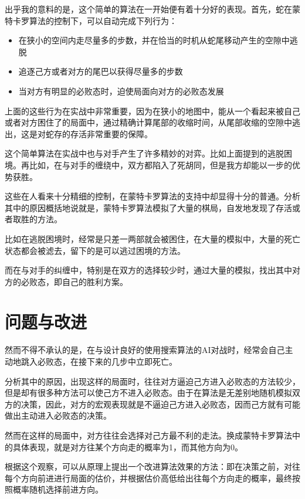 \documentclass[UTF8]{ctexart}
\begin{document}
    出乎我的意料的是，这个简单的算法在一开始便有着十分好的表现。首先，蛇在蒙特卡罗算法的控制下，可以自动完成下列行为：
    \begin{itemize}
        \item 在狭小的空间内走尽量多的步数，并在恰当的时机从蛇尾移动产生的空隙中逃脱
        \item 追逐己方或者对方的尾巴以获得尽量多的步数
        \item 当对方有明显的必败态时，迫使局面向对方的必败态发展
    \end{itemize}
    
    上面的这些行为在实战中非常重要，因为在狭小的地图中，能从一个看起来被自己或者对方困住了的局面中，通过精确计算尾部的收缩时间，从尾部收缩的空隙中逃出，这是对蛇存的存活非常重要的保障。
    
    这个简单算法在实战中也与对手产生了许多精妙的对弈。比如上面提到的逃脱困境。再比如，在与对手的缠绕中，双方都陷入了死胡同，但是我方却能以一步的优势获胜。
    
    这些在人看来十分精细的控制，在蒙特卡罗算法的支持中却显得十分的普通。分析其中的原因概括地说就是，蒙特卡罗算法模拟了大量的棋局，自发地发现了存活或者取胜的方法。
    
    比如在逃脱困境时，经常是只差一两部就会被困住，在大量的模拟中，大量的死亡状态都会被滤去，留下的是可以逃过困境的方法。
    
    而在与对手的纠缠中，特别是在双方的选择较少时，通过大量的模拟，找出其中对方的必败态，即自己的胜利方案。

\section{问题与改进}
    
    然而不得不承认的是，在与设计良好的使用搜索算法的AI对战时，经常会自己主动地跳入必败态，在接下来的几步中立即死亡。
    
    分析其中的原因，出现这样的局面时，往往对方逼迫己方进入必败态的方法较少，但是却有很多种方法可以使己方不进入必败态。由于在算法是无差别地随机模拟双方的决策，因此，对方的宏观表现就是不逼迫己方进入必败态，因而己方就有可能做出主动进入必败态的决策。
    
    然而在这样的局面中，对方往往会选择对己方最不利的走法。换成蒙特卡罗算法中的具体表现，就是对方往某个方向走的概率为1，而其他方向为0。
    
    根据这个观察，可以从原理上提出一个改进算法效果的方法：即在决策之前，对往每个方向前进进行局面的估价，并根据估价高低给出往每个方向走的概率，最终按照概率随机选择前进方向。
    
\end{document}
